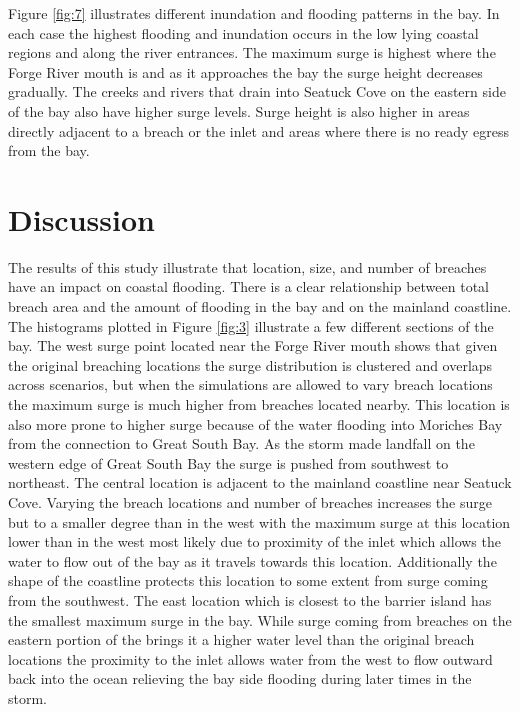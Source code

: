 \documentclass{coastal_paper}
\begin{document}
Figure \ref{fig:7} illustrates different inundation and flooding patterns in the bay. In each case the highest flooding and inundation occurs in the low lying coastal regions and along the river entrances. The maximum surge is highest where the Forge River mouth is and as it approaches the bay the surge height decreases gradually. The creeks and rivers that drain into Seatuck Cove on the eastern side of the bay also have higher surge levels. Surge height is also higher in areas directly adjacent to a breach or the inlet and areas where there is no ready egress from the bay.


\section{Discussion}
The results of this study illustrate that location, size, and number of breaches have an impact on coastal flooding. There is a clear relationship between total breach area and the amount of flooding in the bay and on the mainland coastline. The histograms plotted in Figure \ref{fig:3} illustrate a few different sections of the bay. The west surge point located near the Forge River mouth shows that given the original breaching locations the surge distribution is clustered and overlaps across scenarios, but when the simulations are allowed to vary breach locations the maximum surge is much higher from breaches located nearby. This location is also more prone to higher surge because of the water flooding into Moriches Bay from the connection to Great South Bay. As the storm made landfall on the western edge of Great South Bay the surge is pushed from southwest to northeast.
The central location is adjacent to the mainland coastline near Seatuck Cove. Varying the breach locations and number of breaches increases the surge but to a smaller degree than in the west with the maximum surge at this location lower than in the west most likely due to proximity of the inlet which allows the water to flow out of the bay as it travels towards this location. Additionally the shape of the coastline protects this location to some extent from surge coming from the southwest. 
The east location which is closest to the barrier island has the smallest maximum surge in the bay. While surge coming from breaches on the eastern portion of the brings it a higher water level than the original breach locations the proximity to the inlet allows water from the west to flow outward back into the ocean relieving the bay side flooding during later times in the storm.
\end{document}
